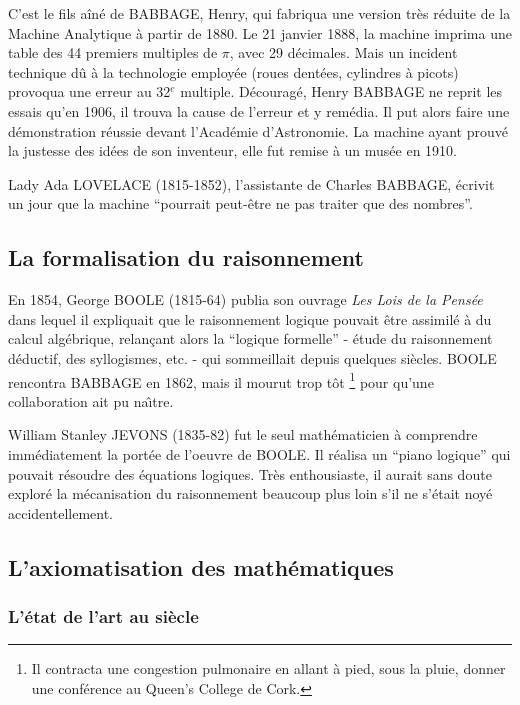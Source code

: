 C'est le fils aîné de BABBAGE, Henry, qui fabriqua une version très
réduite de la Machine Analytique à partir de 1880. Le 21 janvier 1888,
la machine imprima une table des 44 premiers multiples de $\pi$, avec 29
décimales. Mais un incident technique d\^u à la technologie employée
(roues dentées, cylindres à picots) provoqua une erreur au 32$^e$
multiple. Découragé, Henry BABBAGE ne reprit les essais qu'en 1906, il
trouva la cause de l'erreur et y remédia. Il put alors faire une
démonstration réussie devant l'Académie d'Astronomie. La machine ayant
prouvé la justesse des idées de son inventeur, elle fut remise à un
musée en 1910.

Lady Ada LOVELACE (1815-1852), l'assistante de Charles BABBAGE,
écrivit un jour que la machine ``pourrait peut-\^etre ne pas traiter
que des nombres''.


\subsection*{La  formalisation du raisonnement}

En 1854, George BOOLE (1815-64) publia son ouvrage {\em Les Lois de la
 Pensée} dans lequel il expliquait que le raisonnement logique pouvait
 \^etre assimilé à du calcul algébrique, relan\c{c}ant alors la
 ``logique formelle'' - étude du raisonnement déductif, des
 syllogismes, etc. - qui sommeillait depuis quelques siècles. BOOLE
 rencontra BABBAGE en 1862, mais il mourut trop t\^ot
\footnote{Il contracta une congestion pulmonaire en allant à pied, sous la pluie, donner une conférence au Queen's College de Cork.}
pour qu'une collaboration ait pu na\^{\i}tre.

William Stanley JEVONS (1835-82) fut le seul mathématicien à
comprendre immédiatement la portée de l'oeuvre de BOOLE. Il réalisa un
``piano logique'' qui pouvait résoudre des équations logiques. Très
enthousiaste, il aurait sans doute exploré la mécanisation du
raisonnement beaucoup plus loin s'il ne s'était noyé accidentellement.


\subsection*{L'axiomatisation des mathématiques}

\subsubsection*{L'état de l'art au   siècle}

